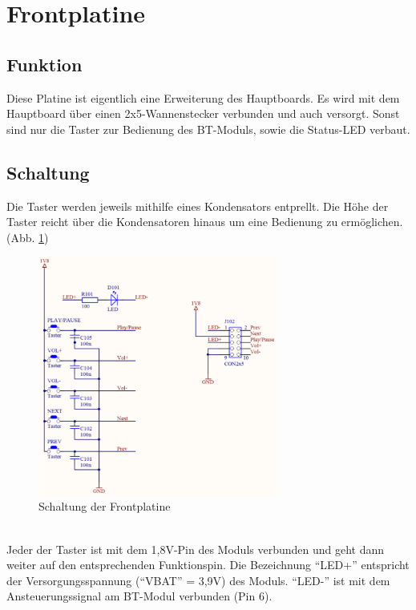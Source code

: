 \section{Frontplatine}
\subsection{Funktion}
Diese Platine ist eigentlich eine Erweiterung des Hauptboards. Es wird mit dem Hauptboard über einen 2x5-Wannenstecker verbunden und auch versorgt. Sonst sind nur die Taster zur Bedienung des BT-Moduls, sowie die Status-LED verbaut.

\subsection{Schaltung}
Die Taster werden jeweils mithilfe eines Kondensators entprellt. Die Höhe der Taster reicht über die Kondensatoren hinaus um eine Bedienung zu ermöglichen. (Abb. \ref{fig:abb3.7})
\begin{figure} [h]
	\centering
	\caption{Schaltung der Frontplatine}
	\label {fig:abb3.7}
	\includegraphics[width=0.7\textwidth]{schaltungen/front_sch.png}
\end{figure} \\
Jeder der Taster ist mit dem 1,8V-Pin des Moduls verbunden und geht dann weiter auf den entsprechenden Funktionspin. Die Bezeichnung \enquote{LED+} entspricht der Versorgungsspannung (\enquote{VBAT} = 3,9V) des Moduls. \enquote{LED-} ist mit dem Ansteuerungssignal am BT-Modul verbunden (Pin 6).

